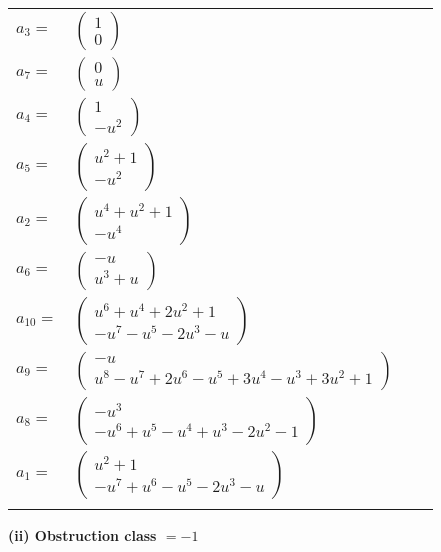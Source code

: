 \documentclass[1p]{elsarticle_modified}
\theoremstyle{definition}
\begin{document}
\begin{tabular}{m{7pt} m{180pt} m{7pt} m{180pt} }
\flushright $a_{3}=$&$\begin{pmatrix}1\\0\end{pmatrix}$ \\
\flushright $a_{7}=$&$\begin{pmatrix}0\\u\end{pmatrix}$ \\
\flushright $a_{4}=$&$\begin{pmatrix}1\\- u^2\end{pmatrix}$ \\
\flushright $a_{5}=$&$\begin{pmatrix}u^2+1\\- u^2\end{pmatrix}$ \\
\flushright $a_{2}=$&$\begin{pmatrix}u^4+u^2+1\\- u^4\end{pmatrix}$ \\
\flushright $a_{6}=$&$\begin{pmatrix}- u\\u^3+u\end{pmatrix}$ \\
\flushright $a_{10}=$&$\begin{pmatrix}u^6+u^4+2 u^2+1\\- u^7- u^5-2 u^3- u\end{pmatrix}$ \\
\flushright $a_{9}=$&$\begin{pmatrix}- u\\u^8- u^7+2 u^6- u^5+3 u^4- u^3+3 u^2+1\end{pmatrix}$ \\
\flushright $a_{8}=$&$\begin{pmatrix}- u^3\\- u^6+u^5- u^4+u^3-2 u^2-1\end{pmatrix}$ \\
\flushright $a_{1}=$&$\begin{pmatrix}u^2+1\\- u^7+u^6- u^5-2 u^3- u\end{pmatrix}$\\&\end{tabular}
\flushleft \textbf{(ii) Obstruction class $= -1$}\\~\\
\end{document}
